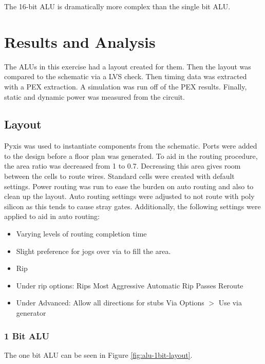 \documentclass[11pt]{article}
\begin{document}
			The 16-bit ALU is dramatically more complex than the single bit ALU.

\section{Results and Analysis}
		
	The ALUs in this exercise had a layout created for them. Then the layout was compared to the schematic via a LVS check. Then timing data was extracted with a PEX extraction. A simulation was run off of the PEX results. Finally, static and dynamic power was measured from the circuit.
		
	\subsection{Layout}
		
		Pyxis was used to instantiate components from the schematic. Ports were added to the design before a floor plan was generated. To aid in the routing procedure, the area ratio was decreased from 1 to 0.7. Decreasing this area gives room between the cells to route wires. Standard cells were created with default settings. Power routing was run to ease the burden on auto routing and also to clean up the layout. Auto routing settings were adjusted to not route with poly silicon as this tends to cause stray gates. Additionally, the following settings were applied to aid in auto routing:
		\begin{itemize}
			\item Varying levels of routing completion time
			\item Slight preference for jogs over via to fill the area.
			\item Rip
			\item Under rip options: 
			\subitem Rips Most Aggressive
			\subitem Automatic Rip Passes
			\subitem Reroute
			\item Under Advanced:
			\subitem Allow all directions for stubs
			\subitem Via Options $>$ Use via generator
		\end{itemize}
	
		\subsubsection{1 Bit ALU}
		
			The one bit ALU can be seen in Figure \ref{fig:alu-1bit-layout}.
		
\end{document}
